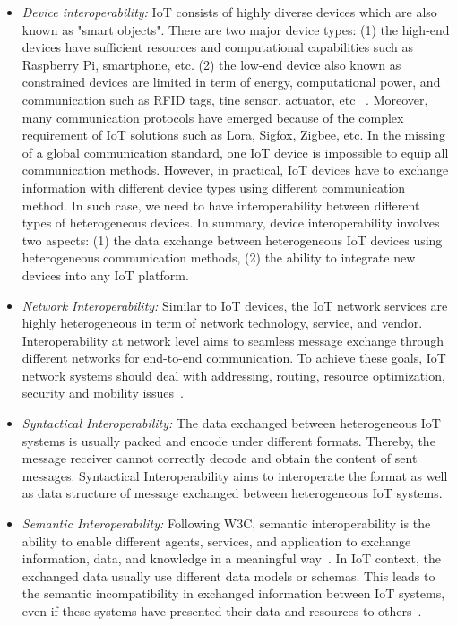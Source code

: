 \begin{itemize}

    \item \textit{Device interoperability: } IoT consists of highly diverse devices which are also known as "smart objects". There are two major device types: (1) the high-end devices have sufficient resources and computational capabilities such as Raspberry Pi, smartphone, etc. (2) the low-end device also known as constrained devices are limited in term of energy, computational power, and communication such as RFID tags, tine sensor, actuator, etc~ \cite{hahm2016operating}. Moreover, many communication protocols have emerged because of the complex requirement of IoT solutions such as Lora, Sigfox, Zigbee, etc. In the missing of a global communication standard, one IoT device is impossible to equip all communication methods. However, in practical, IoT devices have to exchange information with different device types using different communication method. In such case, we need to have interoperability between different types of heterogeneous devices. In summary, device interoperability involves two aspects: (1) the data exchange between heterogeneous IoT devices using heterogeneous communication methods, (2) the ability to integrate new devices into any IoT platform.
    
    \item \textit{Network Interoperability: } Similar to IoT devices, the IoT network services are highly heterogeneous in term of network technology, service, and vendor. Interoperability at network level aims to seamless message exchange through different networks for end-to-end communication. To achieve these goals, IoT network systems should deal with addressing, routing, resource optimization, security and mobility issues~\cite{bello2017network}. 
    
    \item \textit{Syntactical Interoperability: } The data exchanged between heterogeneous IoT systems is usually packed and encode under different formats. Thereby, the message receiver cannot correctly decode and obtain the content of sent messages. Syntactical Interoperability aims to interoperate the format as well as data structure of message exchanged between heterogeneous IoT systems.
    
    \item \textit{Semantic Interoperability: } Following W3C, semantic interoperability is the ability to enable different agents, services, and application to exchange information, data, and knowledge in a meaningful way~\cite{borgia2014internet}. In IoT context, the exchanged data usually use different data models or schemas. This leads to the semantic incompatibility in exchanged information between IoT systems, even if these systems have presented their data and resources to others~\cite{bauer2016semantic}.  
    

\end{itemize}
